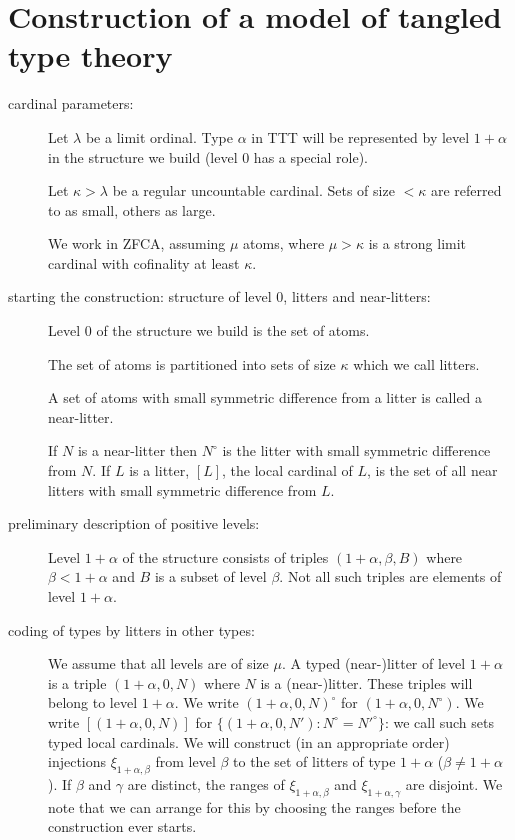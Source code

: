\documentclass[12pt]{article}
\begin{document}
\newpage

\section{Construction of a model of tangled type theory}
\begin{description}

\item[cardinal parameters:]  Let $\lambda$ be a limit ordinal.  Type $\alpha$ in TTT will be represented by level $1+\alpha$ in the structure we build (level 0 has a special role).

Let $\kappa>\lambda$ be a regular uncountable cardinal.  Sets of size $<\kappa$ are referred to as small, others as large.

We work in ZFCA, assuming $\mu$ atoms, where $\mu >\kappa$ is a strong limit cardinal with cofinality at least $\kappa$.

\item[starting the construction:  structure of level 0, litters and near-litters:]

Level 0 of the structure we build is the set of atoms.

The set of atoms is  partitioned into sets of size $\kappa$ which we call litters.

A set of atoms with small symmetric difference from a litter is called a near-litter.  

If $N$ is a near-litter then $N^{\circ}$ is the litter with small symmetric difference from $N$.
If $L$ is a litter, $[L]$, the local cardinal of $L$, is the set of all near litters with small symmetric difference from $L$.

\item[preliminary description of positive levels:]

Level $1+\alpha$ of the structure consists of triples $(1+\alpha,\beta,B)$ where $\beta <1+\alpha$ and $B$ is a subset of level $\beta$.  Not all such triples are elements
of level $1+\alpha$.

\item[coding of types by litters in other types:]

We assume that all levels are of size $\mu$.  A typed (near-)litter of level $1+\alpha$ is a triple $(1+\alpha,0,N)$ where $N$ is a (near-)litter.  These triples will belong to level $1+\alpha$.  We write $(1+\alpha,0,N)^{\circ}$ for
$(1+\alpha,0,N^{\circ})$.  We write $[(1+\alpha,0,N)]$ for $\{(1+\alpha,0,N'):N^\circ = N'^\circ\}$:  we call such sets typed local cardinals.  We will construct (in an appropriate order) injections $\xi_{1+\alpha,\beta}$ from level $\beta$ to the set of litters of type $1+\alpha$ ($\beta \neq 1+\alpha$).  If $\beta$ and $\gamma$ are distinct, the ranges of $\xi_{1+\alpha,\beta}$ and $\xi_{1+\alpha,\gamma}$ are disjoint.  We note that we can arrange for this by choosing the ranges before the construction
ever starts.


\end{description}
\end{document}
